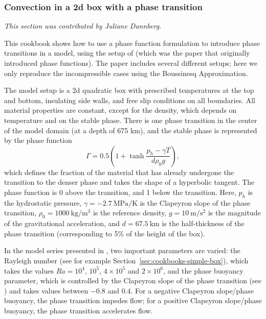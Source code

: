 \subsubsection{Convection in a 2d box with a phase transition}
\label{sec:cookbooks-phase-function}

\textit{This section was contributed by Juliane Dannberg.}

This cookbook shows how to use a phase function formulation to introduce phase transitions in a model, using the setup of \cite{CY85} (which was the paper that originally introduced phase functions). The paper includes several different setups; here we only reproduce the incompressible cases using the Boussinesq Approximation.  

The model setup is a 2d quadratic box with prescribed temperatures at the top and bottom, insulating side walls, and free slip conditions on all boundaries. All material properties are constant, except for the density, which depends on temperature and on the stable phase. There is one phase transition in the center of the model domain (at a depth of 675 km), and the stable phase is represented by the phase function
\begin{equation}
  \Gamma = 0.5 \left(1 + \tanh \frac{p_h - \gamma T}{d \rho_0 g} \right), 
\end{equation}
which defines the fraction of the material that has already undergone the transition to the denser phase and takes the shape of a hyperbolic tangent. The phase function is 0 above the transition, and 1 below the transition. Here, $p_h$ is the hydrostatic pressure, $\gamma = -2.7~\si{\mega\pascal\per\kelvin}$ is the Clapeyron slope of the phase transition, $\rho_0 = 1000~\si{\kg\per\cubic\meter}$ is the reference density, $g = 10~\si{\metre\per\square\second}$ is the magnitude of the gravitational acceleration, and $d = 67.5~\si{\km}$ is the half-thickness of the phase transition (corresponding to 5\% of the height of the box). 

In the model series presented in \cite{CY85}, two important parameters are varied: the Rayleigh number (see for example Section~\ref{sec:cookbooks-simple-box}), which takes the values $Ra = 10^4$, $10^5$, $4 \times 10^5$ and $2 \times 10^6$, and the phase buoyancy parameter, which is controlled by the Clapeyron slope of the phase transition (see \cite{CY85}) and takes values between $-0.8$ and $0.4$. For a negative Clapeyron slope/phase buoyancy, the phase transition impedes flow; for a positive Clapeyron slope/phase buoyancy, the phase transition accelerates flow. 

